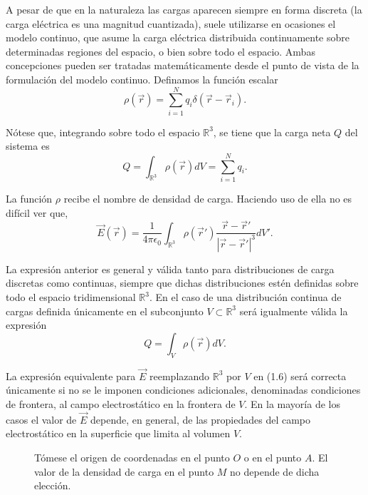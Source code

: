 \documentclass[12pt,a4paper]{book}
\begin{document}
A pesar de que en la naturaleza las cargas aparecen siempre en forma discreta (la carga eléctrica es una magnitud cuantizada), suele utilizarse en ocasiones el modelo continuo, que asume la carga eléctrica distribuida continuamente sobre determinadas regiones del espacio, o bien sobre todo el espacio. Ambas concepciones pueden ser tratadas matemáticamente desde el punto de vista de la formulación del modelo continuo. Definamos la función escalar
\begin{equation}
\rho(\vec{r}) = \sum_{i=1}^{N} q_i \delta(\vec{r} - \vec{r}_i).
\end{equation}

Nótese que, integrando sobre todo el espacio $\mathbb{R}^3$, se tiene que la carga neta $Q$ del sistema es
\begin{equation}
Q = \int_{\mathbb{R}^3} \rho(\vec{r})dV = \sum_{i=1}^{N} q_i.
\end{equation}

La función $\rho$ recibe el nombre de densidad de carga. Haciendo uso de ella no es difícil ver que,
\begin{equation}
\vec{E}(\vec{r}) = \frac{1}{4\pi\epsilon_0} \int_{\mathbb{R}^3} \rho(\vec{r}') \frac{\vec{r} - \vec{r}'}{|\vec{r} - \vec{r}'|^3}dV'.
\end{equation}

La expresión anterior es general y válida tanto para distribuciones de carga discretas como continuas, siempre que dichas distribuciones estén definidas sobre todo el espacio tridimensional $\mathbb{R}^3$. En el caso de una distribución continua de cargas definida únicamente en el subconjunto $V \subset \mathbb{R}^3$ será igualmente válida la expresión
\begin{equation}
Q = \int_{V} \rho(\vec{r})dV.
\end{equation}

La expresión equivalente para $\vec{E}$ reemplazando $\mathbb{R}^3$ por $V$ en (1.6) será correcta únicamente si no se le imponen condiciones adicionales, denominadas condiciones de frontera, al campo electrostático en la frontera de $V$. En la mayoría de los casos el valor de $\vec{E}$ depende, en general, de las propiedades del campo electrostático en la superficie que limita al volumen $V$.

\begin{figure}
\centering
\caption{Tómese el origen de coordenadas en el punto $O$ o en el punto $A$. El valor de la densidad de carga en el punto $M$ no depende de dicha elección.}
\label{fig:1.1}
\end{figure}
\end{document}
